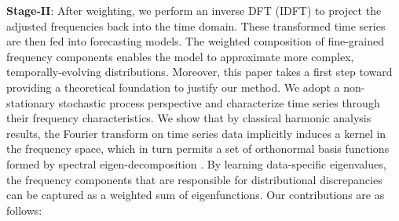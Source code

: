 \documentclass[sigconf,anonymous,review]{acmart}
\begin{document}
\textbf{Stage-II}: After weighting, we perform an inverse DFT (IDFT) to project the adjusted frequencies back into the time domain. 
These transformed time series are then fed into forecasting models. 
The weighted composition of fine-grained frequency components enables the model to approximate more complex, temporally-evolving distributions.
Moreover, this paper takes a first step toward providing a theoretical foundation to justify our method.
We adopt a non-stationary stochastic process perspective and characterize time series through their frequency characteristics.
We show that by classical harmonic analysis results, the Fourier transform on time series data implicitly induces a kernel in the frequency space, which in turn permits a set of orthonormal basis functions formed by spectral eigen-decomposition \citep{berg84harmonic}.
By learning data-specific eigenvalues, the frequency components that are responsible for distributional discrepancies can be captured as a weighted sum of eigenfunctions.
Our contributions are as follows:

\end{document}
